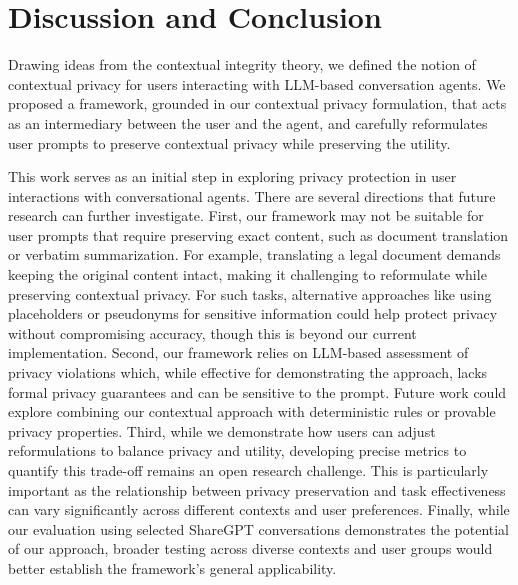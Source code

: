 
\section{Discussion and Conclusion}
\vspace{-5pt}
Drawing ideas from the contextual integrity theory, we defined the notion of contextual privacy for users interacting with LLM-based conversation agents.
We proposed a framework, grounded in our contextual privacy formulation, that acts as an intermediary between the user and the agent, and carefully reformulates user prompts to preserve contextual privacy while preserving the utility.  






This work serves as an initial step in exploring privacy protection in user interactions with conversational agents. There are several directions that future research can further investigate. 
First, our framework may not be suitable for user prompts that require preserving exact content, such as document translation or verbatim summarization. For example, translating a legal document demands keeping the original content intact, making it challenging to reformulate while preserving contextual privacy. For such tasks, alternative approaches like using placeholders or pseudonyms for sensitive information could help protect privacy without compromising accuracy, though this is beyond our current implementation. 
Second, our framework relies on LLM-based assessment of privacy violations which, while effective for demonstrating the approach, lacks formal privacy guarantees and can be sensitive to the prompt. Future work could explore combining our contextual approach with deterministic rules or provable privacy properties. 
Third, while we demonstrate how users can adjust reformulations to balance privacy and utility, developing precise metrics to quantify this trade-off remains an open research challenge. This is particularly important as the relationship between privacy preservation and task effectiveness can vary significantly across different contexts and user preferences. 
Finally, while our evaluation using selected ShareGPT conversations demonstrates the potential of our approach, broader testing across diverse contexts and user groups would better establish the framework's general applicability.









